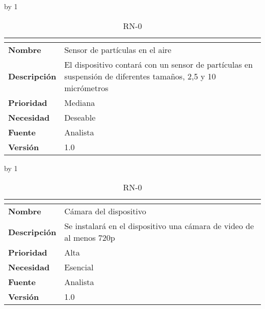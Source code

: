 \advance\rn by 1
\begin{table}[H]
	\caption{RN-0\number\rn}
	\begin{tabular}{|l|p{}|}
		\hline
		\multicolumn{2}{|c|}{\cellcolor[HTML]{BFBFBF}{\color[HTML]{000000} \textbf{RN-0\number\rn}}} \\ \hline
		\textbf{Nombre}      & Sensor de partículas en el aire                                                                              \\ \hline
		\textbf{Descripción} & El dispositivo contará con un sensor de partículas en suspensión de diferentes tamaños, 2,5 y 10 micrómetros \\ \hline
		\textbf{Prioridad}   & Mediana                                                                                                      \\ \hline
		\textbf{Necesidad}   & Deseable                                                                                                     \\ \hline
		\textbf{Fuente}      & Analista                                                                                                     \\ \hline
		\textbf{Versión}     & 1.0                                                                                                          \\ \hline
	\end{tabular}
\end{table}
\advance\rn by 1
\begin{table}[H]
	\caption{RN-0\number\rn}
	\begin{tabular}{|l|p{}|}
		\hline
		\multicolumn{2}{|c|}{\cellcolor[HTML]{BFBFBF}{\color[HTML]{000000} \textbf{RN-0\number\rn}}} \\ \hline
		\textbf{Nombre}      & Cámara del dispositivo                                              \\ \hline
		\textbf{Descripción} & Se instalará en el dispositivo una cámara de video de al menos 720p \\ \hline
		\textbf{Prioridad}   & Alta                                                                \\ \hline
		\textbf{Necesidad}   & Esencial                                                            \\ \hline
		\textbf{Fuente}      & Analista                                                            \\ \hline
		\textbf{Versión}     & 1.0                                                                 \\ \hline
	\end{tabular}
\end{table}
